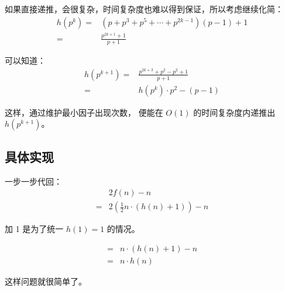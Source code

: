 \documentclass[UTF8]{article}
\begin{document}
	如果直接递推，会很复杂，时间复杂度也难以得到保证，所以考虑继续化简：
	\begin{align*}
	h(p^k) =& (p + p^3 + p^5 + \cdots + p^{2k - 1})(p - 1) + 1
	\\=&
	\frac {p^{2k + 1} + 1} {p + 1}
	\end{align*}

	可以知道：
	\begin{align*}
	h(p^{k + 1}) =& \frac {p^{2k + 3} + p^2 - p^2 + 1} {p + 1}
	\\=&
	h(p^k) \cdot p^2 - (p - 1)
	\end{align*}

	这样，通过维护最小因子出现次数，
	便能在 $O(1)$ 的时间复杂度内递推出 $h(p^{k + 1})$。

	\subsection{具体实现}

	一步一步代回：
	\begin{align*}&
		2f(n) - n
		\\=&
		2(\frac {1} {2} n \cdot (h(n) + 1)) - n
	\end{align*}

	加 1 是为了统一 $h(1) = 1$ 的情况。

	\begin{align*}
		=&
		n \cdot (h(n) + 1) - n
		\\=&
		n \cdot h(n)
	\end{align*}

	这样问题就很简单了。
\end{document}

